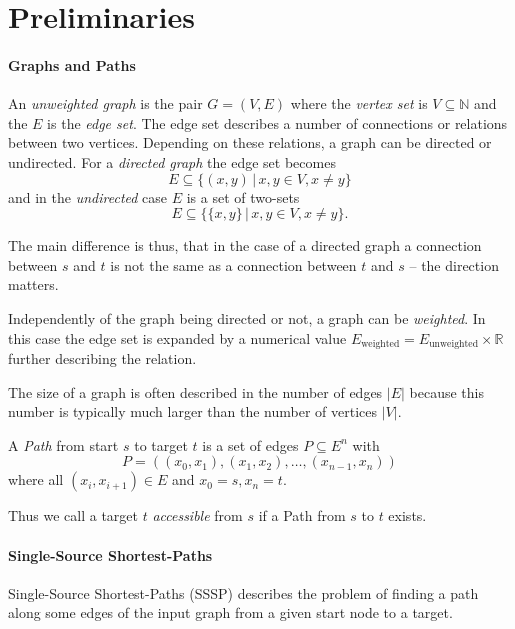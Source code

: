 \documentclass[conference,a4paper]{IEEEtran}
\begin{document}
\section{Preliminaries}

\paragraph{Graphs and Paths}
An \emph{unweighted graph} is the pair $G=(V,E)$ where the \emph{vertex set} is $V\subseteq\mathbb N$ and the $E$ is the \emph{edge set}.
The edge set describes a number of connections or relations between two vertices. Depending on these relations, a graph can be directed or undirected. For a \emph{directed graph} the edge set becomes 
\begin{equation*}
  E\subseteq\{(x,y)\,|\, x,y\in V, x\neq y\}
\end{equation*}
and in the \emph{undirected} case $E$ is a set of two-sets 
\begin{equation*}
  E\subseteq\{\{x,y\}\,|\, x,y\in V, x\neq y\}.
\end{equation*}

The main difference is thus, that in the case of a directed graph a connection between $s$ and $t$ is not the same as a connection between $t$ and $s$ -- the direction matters.

Independently of the graph being directed or not, a graph can be \emph{weighted}. In this case the edge set is expanded by a numerical value $E_{\text{weighted}}=E_{\text{unweighted}}\times \mathbb R$ further describing the relation.

The size of a graph is often described in the number of edges $|E|$ because this number is typically much larger than the number of vertices $|V|$.

A \emph{Path} from start $s$ to target $t$ is a set of edges $P\subseteq E^n$ with
\begin{equation*}
   P=((x_0,x_1),(x_1,x_2),\ldots, (x_{n-1},x_n))
\end{equation*}
where all $(x_i,x_{i+1})\in E$ and $x_0=s, x_n=t$.

Thus we call a target $t$ \emph{accessible} from $s$ if a Path from $s$ to $t$ exists.

\paragraph{Single-Source Shortest-Paths}
Single-Source Shortest-Paths (SSSP) describes the problem of finding a path along some edges of the input graph from a given start node to a target.
\end{document}
